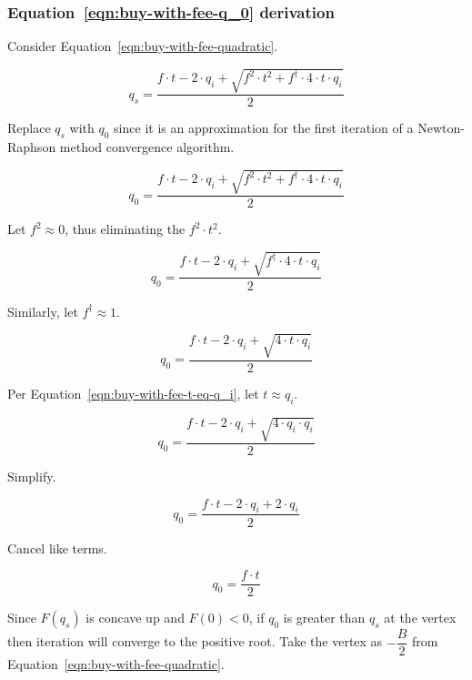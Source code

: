 \subsubsection{Equation~\ref{eqn:buy-with-fee-q_0} derivation}%
\label{sssec:equation-eqn-buy-with-fee-q-0-derivation}

Consider Equation~\ref{eqn:buy-with-fee-quadratic}.

\begin{equation*}
	q_s = \frac{f \cdot t - 2 \cdot q_i +
		\sqrt{f^2 \cdot t^2 + f^{\dagger} \cdot 4 \cdot t \cdot q_i}}{2}
\end{equation*}

Replace $q_s$ with $q_0$ since it is an approximation for the first iteration of a
Newton-Raphson method convergence algorithm.

\begin{equation*}
	q_0 = \frac{f \cdot t - 2 \cdot q_i +
		\sqrt{f^2 \cdot t^2 + f^{\dagger} \cdot 4 \cdot t \cdot q_i}}{2}
\end{equation*}

Let $f^2 \approx 0$, thus eliminating the $f^2 \cdot t^2$.

\begin{equation*}
	q_0 = \frac{f \cdot t - 2 \cdot q_i + \sqrt{f^{\dagger} \cdot 4 \cdot t \cdot q_i}}{2}
\end{equation*}

Similarly, let $f^{\dagger} \approx 1$.

\begin{equation*}
	q_0 = \frac{f \cdot t - 2 \cdot q_i + \sqrt{4 \cdot t \cdot q_i}}{2}
\end{equation*}

Per Equation~\ref{eqn:buy-with-fee-t-eq-q_i}, let $t \approx q_i$.

\begin{equation*}
	q_0 = \frac{f \cdot t - 2 \cdot q_i + \sqrt{4 \cdot q_i \cdot q_i}}{2}
\end{equation*}

Simplify.

\begin{equation*}
	q_0 = \frac{f \cdot t - 2 \cdot q_i + 2 \cdot q_i}{2}
\end{equation*}

Cancel like terms.

\begin{equation*}
	q_0 = \frac{f \cdot t}{2}
\end{equation*}

Since $F(q_s)$ is concave up and $F(0) < 0$, if $q_0$ is greater than $q_s$ at the
vertex then iteration will converge to the positive root. Take the vertex as
$- \dfrac{B}{2}$ from Equation~\ref{eqn:buy-with-fee-quadratic}.

